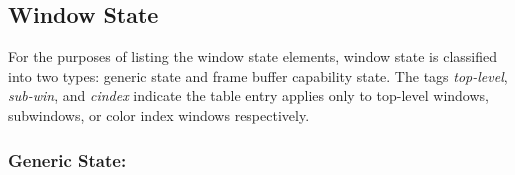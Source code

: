 %
%
%
%

\subsection{Window State}

For the purposes of listing the window state elements, window state is
classified into two types:  generic state and frame buffer capability state.
The tags {\em top-level}, {\em sub-win}, and {\em cindex} indicate the
table entry applies only to top-level windows, subwindows, or color index
windows respectively.

\subsubsection{Generic State:}

